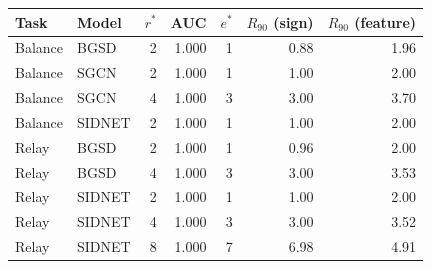 \begin{tabular}{@{}llrrrrr@{}}
\toprule
Task & Model & $r^\ast$ & AUC & $e^\ast$ & $R_{90}$ (sign) & $R_{90}$ (feature) \\
\midrule
Balance & BGSD & 2 & 1.000 & 1 & 0.88 & 1.96 \\
Balance & SGCN & 2 & 1.000 & 1 & 1.00 & 2.00 \\
Balance & SGCN & 4 & 1.000 & 3 & 3.00 & 3.70 \\
Balance & SIDNET & 2 & 1.000 & 1 & 1.00 & 2.00 \\
Relay & BGSD & 2 & 1.000 & 1 & 0.96 & 2.00 \\
Relay & BGSD & 4 & 1.000 & 3 & 3.00 & 3.53 \\
Relay & SIDNET & 2 & 1.000 & 1 & 1.00 & 2.00 \\
Relay & SIDNET & 4 & 1.000 & 3 & 3.00 & 3.52 \\
Relay & SIDNET & 8 & 1.000 & 7 & 6.98 & 4.91 \\
\bottomrule
\end{tabular}
